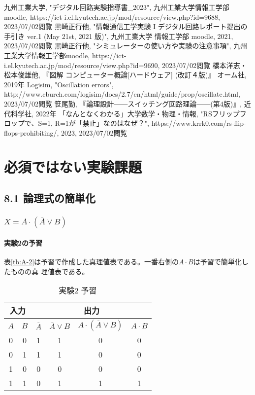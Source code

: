\documentclass[dvipdfmx]{jsarticle}
\begin{document}
\begin{thebibliography}{9}
   九州工業大学, "デジタル回路実験指導書\_2023", 九州工業大学情報工学部moodle, 
  https://ict-i.el.kyutech.ac.jp/mod/resource/view.php?id=9688, 
  2023/07/02閲覧
   黒崎正行他, "情報通信工学実験 I デジタル回路レポート提出の手引き ver.1 (May 21st, 2021 版)", 九州工業大学 情報工学部 moodle,
   2021, 2023/07/02閲覧
   黒崎正行他, "シミュレーターの使い方や実験の注意事項", 九州工業大学情報工学部moodle, 
  https://ict-i.el.kyutech.ac.jp/mod/resource/view.php?id=9690,
   2023/07/02閲覧
   橋本洋志・松本俊雄他, 『図解 コンピューター概論[ハードウェア] (改訂４版)』
  オーム社, 2019年
   Logisim, "Oscillation errors", 
  http://www.cburch.com/logisim/docs/2.7/en/html/guide/prop/oscillate.html, 
  2023/07/02閲覧
   笹尾勤, 『論理設計――スイッチング回路理論――(第4版)』, 
  近代科学社, 2022年
   「なんとなくわかる」大学数学・物理・情報, "RSフリップフロップで、S=1, R=1が「禁止」なのはなぜ？", 
  https://www.krrk0.com/rs-flip-flops-prohibiting/, 
  2023, 2023/07/02閲覧
\end{thebibliography}

\newpage

\renewcommand{\thesection}{\Alph{section}}
\setcounter{section}{0}
\section{必須ではない実験課題}
\label{Aiu}

\subsection{8.1 論理式の簡単化}

\subsubsection{$X = A \cdot (\overline{A} \vee B)$}

\paragraph{実験2の予習}
表\ref*{tb:A-2}は予習で作成した真理値表である。一番右側の$A \cdot B$は予習で簡単化したものの真
理値表である。
\begin{table}[hbtp]
  \centering
  \caption{実験2 予習}
  \begin{tabular}{|c|c||c|c|c|c|} \hline
    \multicolumn{2}{|c||}{入力} & \multicolumn{4}{c|}{出力} \\ \hline
    $A$ & $B$ & $\overline{A}$ & $\overline{A} \vee B$ & $A \cdot (\overline{A} \vee B)$ & $A \cdot B$ \\ \hline
    0 & 0 & 1 & 1 & 0 & 0 \\ \hline
    0 & 1 & 1 & 1 & 0 & 0 \\ \hline
    1 & 0 & 0 & 0 & 0 & 0 \\ \hline
    1 & 1 & 0 & 1 & 1 & 1 \\ \hline
  \end{tabular}
  \label{tb:A-1}
\end{table}
\end{document}
